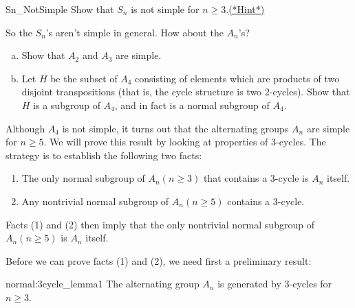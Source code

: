 \begin{exercise}{Sn_NotSimple}
Show that $S_n$ is not simple for $n \geq 3$.\hyperref[sec:Cosets:Hints]{(*Hint*)}
\end{exercise}

So the $S_n$'s aren't simple in general.  How about the $A_n$'s?

\begin{exercise}{}
\begin{enumerate}[(a)]
\item
Show that $A_2$ and $A_3$ are simple.
\item
Let $H$ be the subset of $A_4$ consisting of elements which are products of two disjoint  transpositions (that is, the cycle structure is two 2-cycles). Show that $H$ is a subgroup of $A_4$, and in fact is a normal subgroup of $A_4$.
\end{enumerate}
\end{exercise}

Although $A_4$ is not simple, it turns out that the alternating groups $A_n$ are simple for
$n \geq 5$. We will prove this result by looking at properties of 3-cycles. The strategy is to establish the following two facts:
\begin{enumerate}[(1)]
\item
The only  normal subgroup of $A_n (n \geq 3)$ that contains a 3-cycle is $A_n$ itself.
\item
Any nontrivial normal subgroup of $A_n (n \geq 5)$ contains a 3-cycle.
\end{enumerate}
Facts (1) and (2) then imply that the only nontrivial normal subgroup of $A_n (n \geq 5)$ is $A_n$ itself.

Before we can prove facts (1) and (2), we need first a preliminary result: 

\begin{prop}{normal:3cycle_lemma1}
The alternating group $A_n$ is generated by $3$-cycles for $n \geq 3$.
\end{prop}
 
